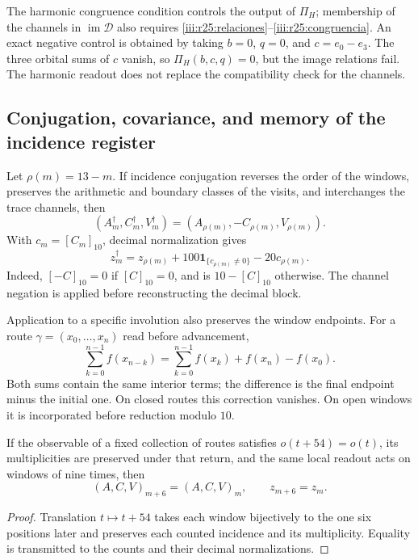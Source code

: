 The harmonic congruence condition controls the output of $\Pi_H$;
membership of the channels in $\operatorname{im}\mathcal D$
also requires \eqref{iii:r25:relaciones}--\eqref{iii:r25:congruencia}.
An exact negative control is obtained by taking $b=0$, $q=0$, and
$c=e_0-e_3$. The three orbital sums of $c$ vanish, so
$\Pi_H(b,c,q)=0$, but the image relations fail.
The harmonic readout does not replace the compatibility check
for the channels.

\subsection{Conjugation, covariance, and memory of the incidence register}
\label{iii:r25:transporte}

Let $\rho(m)=13-m$. If incidence conjugation reverses the
order of the windows, preserves the arithmetic and boundary classes
of the visits, and interchanges the trace channels, then
\[
 (A_m^\dagger,C_m^\dagger,V_m^\dagger)
 =(A_{\rho(m)},-C_{\rho(m)},V_{\rho(m)}).
\]
With $c_m=[C_m]_{10}$, decimal normalization gives
\begin{equation}
 z_m^\dagger=z_{\rho(m)}
 +100\mathbf1_{\{c_{\rho(m)}\ne0\}}-20c_{\rho(m)}.
 \label{iii:r25:conjugacion}
\end{equation}
Indeed, $[-C]_{10}=0$ if $[C]_{10}=0$, and is
$10-[C]_{10}$ otherwise. The channel negation is
applied before reconstructing the decimal block.

Application to a specific involution also preserves the
window endpoints. For a route
$\gamma=(x_0,\ldots,x_n)$ read before advancement,
\begin{equation}
 \sum_{k=0}^{n-1}f(x_{n-k})
 =\sum_{k=0}^{n-1}f(x_k)+f(x_n)-f(x_0).
 \label{iii:r25:extremos}
\end{equation}
Both sums contain the same interior terms; the difference
is the final endpoint minus the initial one. On closed routes this
correction vanishes. On open windows it is incorporated before
reduction modulo $10$.

\begin{proposition}
\label{iii:r25:periodo}
If the observable of a fixed collection of routes satisfies
$o(t+54)=o(t)$, its multiplicities are preserved under that return,
and the same local readout acts on windows of nine times,
then
\[
 (A,C,V)_{m+6}=(A,C,V)_m,\qquad z_{m+6}=z_m.
\]
\end{proposition}
\begin{proof}
Translation $t\mapsto t+54$ takes each window bijectively
to the one six positions later and preserves each counted incidence
and its multiplicity. Equality is transmitted to the counts
and their decimal normalizations.
\end{proof}

